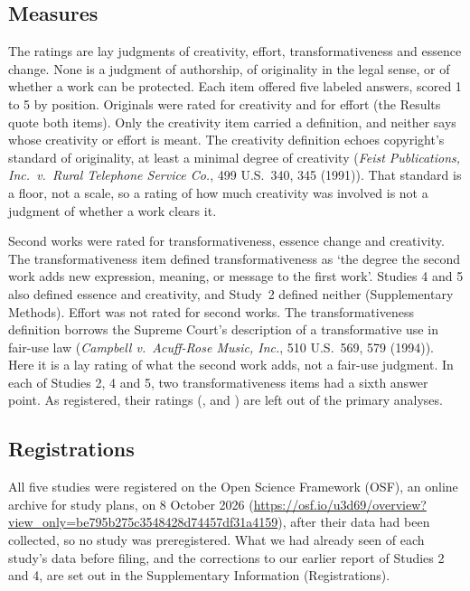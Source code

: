 \subsection*{Measures}

The ratings are lay judgments of creativity, effort, transformativeness and essence change. None is a judgment of authorship, of originality in the legal sense, or of whether a work can be protected. Each item offered five labeled answers, scored 1 to 5 by position. Originals were rated for creativity and for effort (the Results quote both items). Only the creativity item carried a definition, and neither says whose creativity or effort is meant. The creativity definition echoes copyright's standard of originality, at least a minimal degree of creativity (\emph{Feist Publications, Inc.\ v.\ Rural Telephone Service Co.}, 499 U.S.~340, 345 (1991)). That standard is a floor, not a scale, so a rating of how much creativity was involved is not a judgment of whether a work clears it.

Second works were rated for transformativeness, essence change and creativity. The transformativeness item defined transformativeness as `the degree the second work adds new expression, meaning, or message to the first work'. Studies 4 and 5 also defined essence and creativity, and Study~2 defined neither (Supplementary Methods). Effort was not rated for second works. The transformativeness definition borrows the Supreme Court's description of a transformative use in fair-use law (\emph{Campbell v.\ Acuff-Rose Music, Inc.}, 510 U.S.~569, 579 (1994)). Here it is a lay rating of what the second work adds, not a fair-use judgment. In each of Studies 2, 4 and 5, two transformativeness items had a sixth answer point. As registered, their ratings (\STwoNSixPointDropped, \SFourNSixPointDropped{} and \SFiveNSixPointDropped) are left out of the primary analyses.

\subsection*{Registrations}

All five studies were registered on the Open Science Framework (OSF), an online archive for study plans, on 8 October 2026 (\url{https://osf.io/u3d69/overview?view_only=be795b275c3548428d74457df31a4159}), after their data had been collected, so no study was preregistered. What we had already seen of each study's data before filing, and the corrections to our earlier report of Studies 2 and 4, are set out in the Supplementary Information (Registrations).

